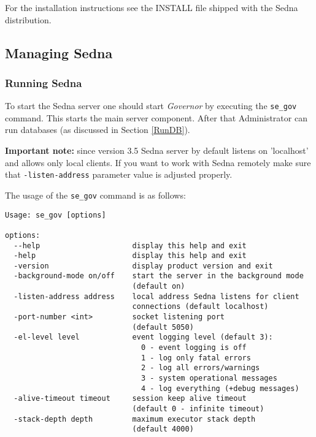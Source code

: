 \documentclass[a4paper,12pt]{article}
\begin{document}
For the installation instructions see the INSTALL file shipped with the
Sedna distribution.


\subsection{Managing Sedna}
\subsubsection{Running Sedna}
\label{StartSedna}

To start the Sedna server one should start \emph{Governor} by executing the
\verb!se_gov! command. This starts the main server component. After that
Administrator can run databases (as discussed in Section \ref{RunDB}).

\textbf{Important note:} since version 3.5 Sedna server by default listens on
'localhost' and allows only local clients. If you want to work with Sedna
remotely make sure that \verb!-listen-address! parameter value is adjusted
properly.

The usage of the \verb!se_gov! command is as follows:

\small{
\begin{verbatim}
Usage: se_gov [options]

options:
  --help                     display this help and exit
  -help                      display this help and exit
  -version                   display product version and exit
  -background-mode on/off    start the server in the background mode
                             (default on)
  -listen-address address    local address Sedna listens for client
                             connections (default localhost)
  -port-number <int>         socket listening port
                             (default 5050)
  -el-level level            event logging level (default 3):
                               0 - event logging is off
                               1 - log only fatal errors
                               2 - log all errors/warnings
                               3 - system operational messages
                               4 - log everything (+debug messages)
  -alive-timeout timeout     session keep alive timeout
                             (default 0 - infinite timeout)
  -stack-depth depth         maximum executor stack depth
                             (default 4000)
\end{verbatim}}
\end{document}
